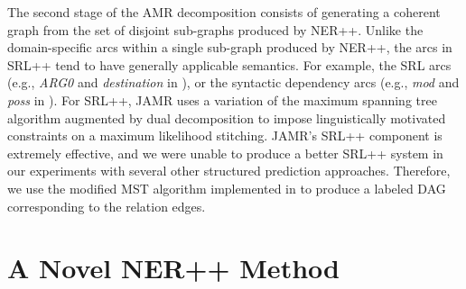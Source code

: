 \documentclass[11pt]{article}
\newcommand\e[1]{\textit{#1}} %
\begin{document}

The second stage of the AMR decomposition consists of generating a coherent graph
  from the set of disjoint sub-graphs produced by NER++.
Unlike the domain-specific arcs within a single sub-graph produced by NER++, the
  arcs in SRL++ tend to have generally applicable semantics.
For example, the SRL arcs (e.g., \e{ARG0} and \e{destination} in ),
  or the syntactic dependency arcs (e.g., \e{mod} and \e{poss} in ).
For SRL++, JAMR uses a variation of the maximum spanning tree algorithm augmented by dual decomposition to impose linguistically motivated constraints on a maximum likelihood stitching. JAMR's SRL++ component is extremely effective, and we were unable to produce a better SRL++ system in our experiments with several other structured prediction approaches.
Therefore, we use the modified MST algorithm implemented in  to produce
  a labeled DAG corresponding to the relation edges.



\section{A Novel NER++ Method}\label{sec:nerplusplus}
\end{document}
